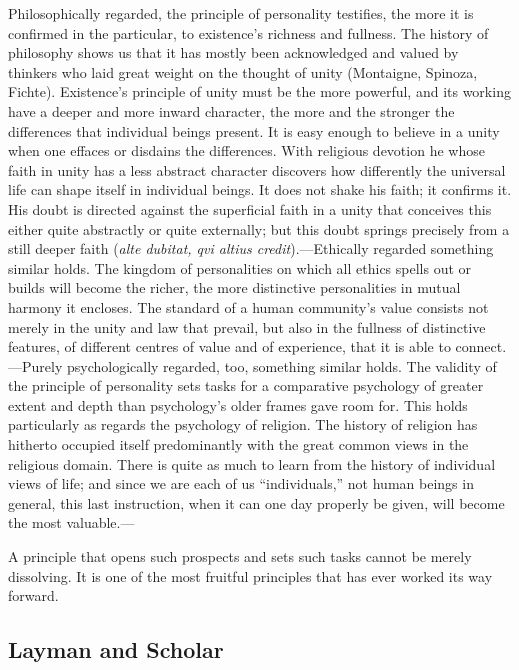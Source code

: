 \documentclass[12pt,a4paper]{book}
\newcommand{\opage}[1]{\marginnote{\footnotesize\textit{[#1]}}}
\begin{document}
Philosophically regarded, the principle of personality testifies, the more it is confirmed in the
particular, to existence's richness and fullness. The 
\opage{204}history of philosophy shows us that it has mostly
been acknowledged and valued by thinkers who laid great weight on the thought of unity (Montaigne,
Spinoza, Fichte). Existence's principle of unity must be the more powerful, and its working have a deeper
and more inward character, the more and the stronger the differences that individual beings present. It
is easy enough to believe in a unity when one effaces or disdains the differences. With religious
devotion he whose faith in unity has a less abstract character discovers how differently the universal
life can shape itself in individual beings. It does not shake his faith; it confirms it. His doubt is
directed against the superficial faith in a unity that conceives this either quite abstractly or quite
externally; but this doubt springs precisely from a still deeper faith (\textit{alte dubitat, qvi altius
credit}).---Ethically regarded something similar holds. The kingdom of personalities on which all ethics
spells out or builds will become the richer, the more distinctive personalities in mutual harmony it
encloses. The standard of a human community's value consists not merely in the unity and law that
prevail, but also in the fullness of distinctive features, of different centres of value and of
experience, that it is able to connect.---Purely psychologically regarded, too, something similar holds.
The validity of the principle of personality sets tasks for a comparative psychology of greater extent
and depth than psychology's older frames gave room for. This holds particularly as regards the psychology
of religion. The history of religion has hitherto occupied itself predominantly with the great common
views in the religious domain. There is quite as much to learn from the history of individual views of
life; and since we are each of us ``individuals,'' not human beings in general, this last instruction,
when it can one day properly be given, will become the most valuable.---

A principle that opens such prospects and sets such tasks cannot be merely dissolving. It is one of the
most fruitful principles that has ever worked its way forward.


\subsection{Layman and Scholar}
\label{ssec:layman-scholar}
\end{document}
